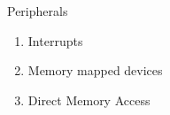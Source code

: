 \documentclass{beamer}
\begin{document}
\begin{frame}[t]{Peripherals}
  \begin{enumerate}
  \item<1-> Interrupts
  \item<2-> Memory mapped devices
  \item<4-> Direct Memory Access
\end{enumerate}
\begin{center}
\end{center}
\end{frame}
\end{document}
